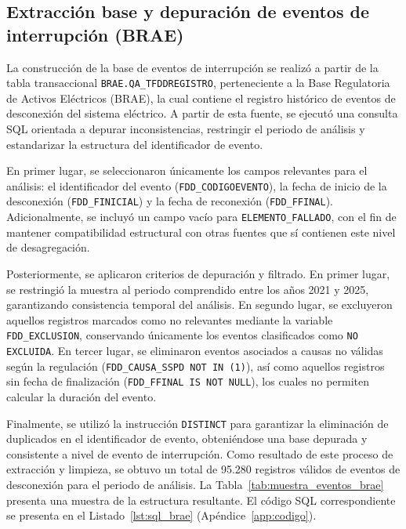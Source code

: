 \subsection{Extracción base y depuración de eventos de interrupción (BRAE)}
\label{sec:extraccion_brae}
La construcción de la base de eventos de interrupción se realizó a partir de la tabla transaccional \texttt{BRAE.QA\_TFDDREGISTRO}, perteneciente a la Base Regulatoria de Activos Eléctricos (BRAE), la cual contiene el registro histórico de eventos de desconexión del sistema eléctrico. A partir de esta fuente, se ejecutó una consulta SQL orientada a depurar inconsistencias, restringir el periodo de análisis y estandarizar la estructura del identificador de evento.

En primer lugar, se seleccionaron únicamente los campos relevantes para el análisis: el identificador del evento (\texttt{FDD\_CODIGOEVENTO}), la fecha de inicio de la desconexión (\texttt{FDD\_FINICIAL}) y la fecha de reconexión (\texttt{FDD\_FFINAL}). Adicionalmente, se incluyó un campo vacío para \texttt{ELEMENTO\_FALLADO}, con el fin de mantener compatibilidad estructural con otras fuentes que sí contienen este nivel de desagregación.

Posteriormente, se aplicaron criterios de depuración y filtrado. En primer lugar, se restringió la muestra al periodo comprendido entre los años 2021 y 2025, garantizando consistencia temporal del análisis. En segundo lugar, se excluyeron aquellos registros marcados como no relevantes mediante la variable \texttt{FDD\_EXCLUSION}, conservando únicamente los eventos clasificados como \texttt{NO EXCLUIDA}. En tercer lugar, se eliminaron eventos asociados a causas no válidas según la regulación (\texttt{FDD\_CAUSA\_SSPD NOT IN (1)}), así como aquellos registros sin fecha de finalización (\texttt{FDD\_FFINAL IS NOT NULL}), los cuales no permiten calcular la duración del evento.

    Finalmente, se utilizó la instrucción \texttt{DISTINCT} para garantizar la eliminación de duplicados en el identificador de evento, obteniéndose una base depurada y consistente a nivel de evento de interrupción. Como resultado de este proceso de extracción y limpieza, se obtuvo un total de 95{.}280 registros válidos de eventos de desconexión para el periodo de análisis. La Tabla~\ref{tab:muestra_eventos_brae} presenta una muestra de la estructura resultante. El código SQL correspondiente se presenta en el Listado~\ref{lst:sql_brae} (Apéndice~\ref{app:codigo}).

